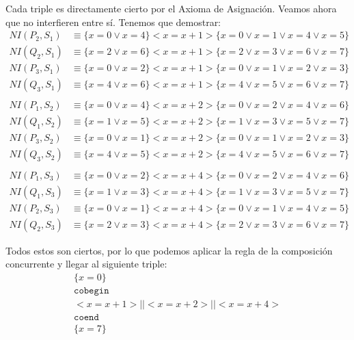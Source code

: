 \begin{ejercicio}
    Cada triple es directamente cierto por el Axioma de Asignación. Veamos ahora que no interfieren entre sí. Tenemos que demostrar:
    \begin{align*}
        NI(P_2, S_1) &\equiv \{x=0 \lor x=4\} <x=x+1> \{x=0\lor x=1\lor x=4\lor x=5\} \\
        NI(Q_2, S_1) &\equiv \{x=2 \lor x=6\} <x=x+1> \{x=2\lor x=3\lor x=6\lor x=7\} \\
        NI(P_3, S_1) &\equiv \{x=0 \lor x=2\} <x=x+1> \{x=0\lor x=1\lor x=2\lor x=3\} \\
        NI(Q_3, S_1) &\equiv \{x=4 \lor x=6\} <x=x+1> \{x=4\lor x=5\lor x=6\lor x=7\} \\ \\
        NI(P_1, S_2) &\equiv \{x=0 \lor x=4\} <x=x+2> \{x=0\lor x=2\lor x=4\lor x=6\} \\
        NI(Q_1, S_2) &\equiv \{x=1 \lor x=5\} <x=x+2> \{x=1\lor x=3\lor x=5\lor x=7\} \\
        NI(P_3, S_2) &\equiv \{x=0 \lor x=1\} <x=x+2> \{x=0\lor x=1\lor x=2\lor x=3\} \\
        NI(Q_3, S_2) &\equiv \{x=4 \lor x=5\} <x=x+2> \{x=4\lor x=5\lor x=6\lor x=7\} \\ \\
        NI(P_1, S_3) &\equiv \{x=0 \lor x=2\} <x=x+4> \{x=0\lor x=2\lor x=4\lor x=6\} \\
        NI(Q_1, S_3) &\equiv \{x=1 \lor x=3\} <x=x+4> \{x=1\lor x=3\lor x=5\lor x=7\} \\
        NI(P_2, S_3) &\equiv \{x=0 \lor x=1\} <x=x+4> \{x=0\lor x=1\lor x=4\lor x=5\} \\
        NI(Q_2, S_3) &\equiv \{x=2 \lor x=3\} <x=x+4> \{x=2\lor x=3\lor x=6\lor x=7\}
    \end{align*}

    Todos estos son ciertos, por lo que podemos aplicar la regla de la composición concurrente y llegar al siguiente triple:
    \begin{gather*}
        \{x=0\} \\
        \texttt{cobegin} \\
        <x=x+1> || <x=x+2> || <x=x+4> \\
        \texttt{coend} \\
        \{x=7\}
    \end{gather*}

\end{ejercicio}


